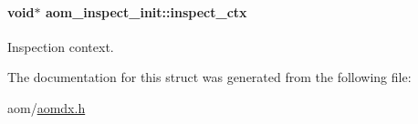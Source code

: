\paragraph[{\texorpdfstring{inspect\+\_\+ctx}{inspect_ctx}}]{\setlength{\rightskip}{0pt plus 5cm}void$\ast$ aom\+\_\+inspect\+\_\+init\+::inspect\+\_\+ctx}\hypertarget{structaom__inspect__init_a26c618c754d4b278fb636353e6b9d96d}{}\label{structaom__inspect__init_a26c618c754d4b278fb636353e6b9d96d}
Inspection context. 

The documentation for this struct was generated from the following file\+:\begin{DoxyCompactItemize}
\item 
aom/\hyperlink{aomdx_8h}{aomdx.\+h}\end{DoxyCompactItemize}
